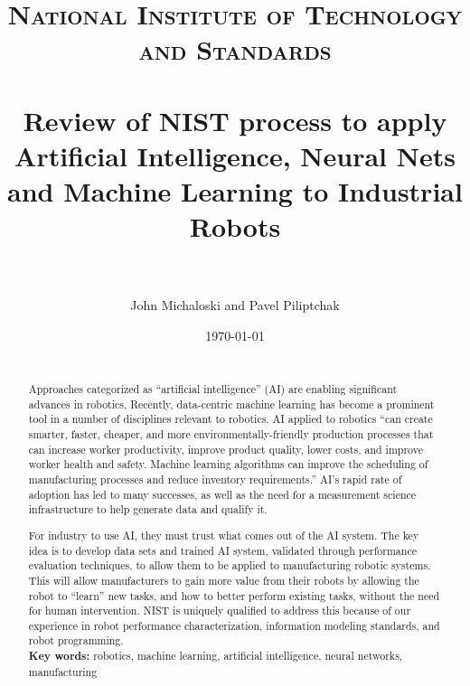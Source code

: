 \documentclass[paper=letter, fontsize=11pt]{scrartcl} %
\title{	
\normalfont \normalsize 
\textsc{National Institute of Technology and Standards} \\ [25pt] %
\horrule{0.5pt} \\[0.4cm] %
\huge  Review of NIST process to apply Artificial Intelligence, Neural Nets and Machine Learning to Industrial Robots \\ %
\horrule{2pt} \\[0.5cm] %
}
\author{John Michaloski and Pavel Piliptchak} %
\date{\normalsize\today} %
\numberwithin{equation}{section} %
\numberwithin{figure}{section} %
\numberwithin{table}{section} %
\begin{document}
\maketitle %

\newpage
\begin{abstract}

{ }\\

Approaches categorized as ``artificial intelligence'' (AI) are enabling significant advances in robotics.  Recently, data-centric machine learning has become a prominent tool in a number of disciplines relevant to robotics.  AI applied to robotics ``can create smarter, faster, cheaper, and more environmentally-friendly production processes that can increase worker productivity, improve product quality, lower costs, and improve worker health and safety. Machine learning algorithms can improve the scheduling of manufacturing processes and reduce inventory requirements.''  AI's rapid rate of adoption has led to many successes, as well as the need for a measurement science infrastructure to help generate data and qualify it.  

For industry to use AI, they must trust what comes out of the AI system. The key idea is to develop data sets and trained AI system, validated through performance evaluation techniques, to allow them to be applied to manufacturing robotic systems. This will allow manufacturers to gain more value from their robots by allowing the robot to ``learn'' new tasks, and how to better perform existing tasks, without the need for human intervention. NIST is uniquely qualified to address this because of our experience in robot performance characterization, information modeling standards, and robot programming.  \\


\textbf{Key words:} robotics, machine learning, artificial intelligence, neural networks, manufacturing
    
\end{abstract}

\newpage
\tableofcontents







\end{document}
